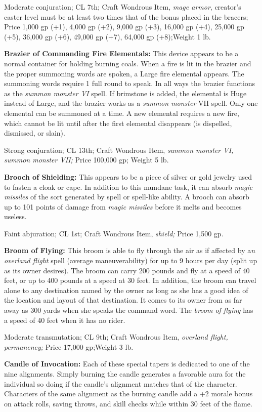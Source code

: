 Moderate conjuration; CL 7th; Craft Wondrous Item, \textit{mage armor}, creator's 
caster level must be at least two times that of the bonus placed in the bracers; 
Price 1,000 gp (+1), 4,000 gp (+2), 9,000 gp (+3), 16,000 gp (+4), 25,000 gp (+5), 
36,000 gp (+6), 49,000 gp (+7), 64,000 gp (+8);Weight 1 lb.

\textbf{Brazier of Commanding Fire Elementals: }This device appears to be a normal 
container for holding burning coals. When a fire is lit in the brazier and the 
proper summoning words are spoken, a Large fire elemental appears. The summoning 
words require 1 full round to speak. In all ways the brazier functions as the \textit{summon 
monster VI }spell. If brimstone is added, the elemental is Huge instead of Large, 
and the brazier works as a \textit{summon monster }VII spell. Only one elemental 
can be summoned at a time. A new elemental requires a new fire, which cannot be 
lit until after the first elemental disappears (is dispelled, dismissed, or slain).

Strong conjuration; CL 13th; Craft Wondrous Item, \textit{summon monster VI, summon 
monster VII; }Price 100,000 gp; Weight 5 lb.

\textbf{Brooch of Shielding: }This appears to be a piece of silver or gold jewelry 
used to fasten a cloak or cape. In addition to this mundane task, it can absorb 
\textit{magic missiles }of the sort generated by spell or spell-like ability. A 
brooch can absorb up to 101 points of damage from \textit{magic missiles }before 
it melts and becomes useless.

Faint abjuration; CL 1st; Craft Wondrous Item, \textit{shield; }Price 1,500 gp.

\textbf{Broom of Flying:} This broom is able to fly through the air as if affected 
by a\textit{n overland flight }spell (average maneuverability) for up to 9 hours 
per day (split up as its owner desires). The broom can carry 200 pounds and fly 
at a speed of 40 feet, or up to 400 pounds at a speed at 30 feet. In addition, 
the broom can travel alone to any destination named by the owner as long as she 
has a good idea of the location and layout of that destination. It comes to its 
owner from as far away as 300 yards when she speaks the command word. The \textit{broom 
of flying }has a speed of 40 feet when it has no rider.

Moderate transmutation; CL 9th; Craft Wondrous Item, \textit{overland flight, permanency; 
}Price 17,000 gp;Weight 3 lb.

\textbf{Candle of Invocation: }Each of these special tapers is dedicated to one 
of the nine alignments. Simply burning the candle generates a favorable aura for 
the individual so doing if the candle's alignment matches that of the character. 
Characters of the same alignment as the burning candle add a +2 morale bonus on 
attack rolls, saving throws, and skill checks while within 30 feet of the flame.

